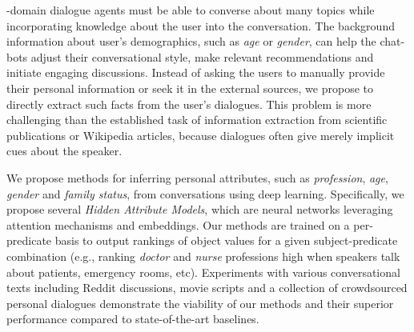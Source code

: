%
%
-domain dialogue agents must be able to converse about many topics while incorporating knowledge about the user into the conversation.
The background information about user's demographics, such as \textit{age} or \textit{gender}, can help the chat-bots adjust their conversational style, make relevant recommendations and initiate engaging discussions. Instead of asking the users to manually provide their personal information or seek it in the external sources, we propose to directly extract such facts from the user's dialogues. This problem is more challenging than the established task of 
information extraction from scientific publications or Wikipedia articles, because dialogues
often give merely implicit cues about the speaker.

We propose methods for inferring personal attributes, such as
\textit{profession}, \textit{age}, \textit{gender} and \textit{family status}, from conversations using deep learning.
Specifically, we propose several
\textit{Hidden Attribute Models}, which are 
neural networks 
leveraging 
attention mechanisms and embeddings. 
Our methods are trained on a per-predicate basis to output
rankings of object values for a given subject-predicate combination
(e.g., ranking \textit{doctor} and \textit{nurse} professions high when speakers talk
about patients, emergency rooms, etc).
Experiments with various conversational texts including Reddit discussions, movie scripts and a collection of crowdsourced personal dialogues
demonstrate the viability of our methods and their superior performance compared
to state-of-the-art baselines.
